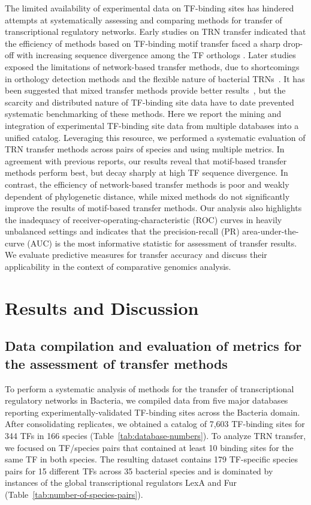 The limited availability of experimental data on TF-binding sites has hindered
attempts at systematically assessing and comparing methods for transfer of
transcriptional regulatory networks. Early studies on TRN transfer indicated
that the efficiency of methods based on TF-binding motif transfer faced a sharp
drop-off with increasing sequence divergence among the TF orthologs
\cite{yu2004annotation}. Later studies exposed the limitations of network-based
transfer methods, due to shortcomings in orthology detection methods and the
flexible nature of bacterial TRNs~\cite{babu2006evolutionary,
  chavez2006bacterial, price2007orthologous}. It has been suggested that mixed
transfer methods provide better results~\cite{baumbach2010power}, but the
scarcity and distributed nature of TF-binding site data have to date prevented
systematic benchmarking of these methods. Here we report the mining
and integration of experimental TF-binding site data from multiple databases
into a unified catalog. Leveraging this resource, we performed a systematic
evaluation of TRN transfer methods across pairs of species and using multiple
metrics. In agreement with previous reports, our results reveal that
motif-based transfer methods perform best, but decay sharply at high TF
sequence divergence. In contrast, the efficiency of network-based transfer
methods is poor and weakly dependent of phylogenetic distance, while mixed
methods do not significantly improve the results of motif-based transfer
methods. Our analysis also highlights the inadequacy of
receiver-operating-characteristic (ROC) curves in heavily unbalanced settings
and indicates that the precision-recall (PR) area-under-the-curve (AUC) is the
most informative statistic for assessment of transfer results. We evaluate
predictive measures for transfer accuracy and discuss their applicability in
the context of comparative genomics analysis.


\section{Results and Discussion}

\subsection{Data compilation and evaluation of metrics for the assessment of
  transfer methods}

To perform a systematic analysis of methods for the transfer of transcriptional
regulatory networks in Bacteria, we compiled data from five major databases
reporting experimentally-validated TF-binding sites across the Bacteria
domain. After consolidating replicates, we obtained a catalog of 7,603
TF-binding sites for 344 TFs in 166 species
(Table~\ref{tab:database-numbers}). To analyze TRN transfer, we focused on
TF/species pairs that contained at least 10 binding sites for the same TF in
both species. The resulting dataset contains 179 TF-specific species pairs for
15 different TFs across 35 bacterial species and is dominated by instances of
the global transcriptional regulators LexA and Fur
(Table~\ref{tab:number-of-species-pairs}).

